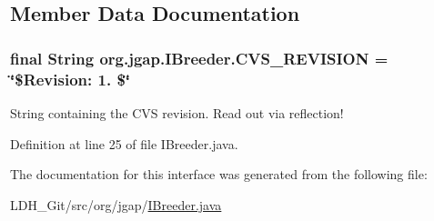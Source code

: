 \subsection{Member Data Documentation}
\hypertarget{interfaceorg_1_1jgap_1_1_i_breeder_acb61f1377521b2c3934f96c80b1ca70f}{
\subsubsection[{C\-V\-S\-\_\-\-R\-E\-V\-I\-S\-I\-O\-N}]{\setlength{\rightskip}{0pt plus 5cm}final String org.\-jgap.\-I\-Breeder.\-C\-V\-S\-\_\-\-R\-E\-V\-I\-S\-I\-O\-N = \char`\"{}\$Revision\-: 1. \$\char`\"{}\hspace{0.3cm}{\ttfamily [static]}}}\label{interfaceorg_1_1jgap_1_1_i_breeder_acb61f1377521b2c3934f96c80b1ca70f}
String containing the C\-V\-S revision. Read out via reflection! 

Definition at line 25 of file I\-Breeder.\-java.



The documentation for this interface was generated from the following file\-:\begin{DoxyCompactItemize}
\item 
L\-D\-H\-\_\-\-Git/src/org/jgap/\hyperlink{_i_breeder_8java}{I\-Breeder.\-java}\end{DoxyCompactItemize}
